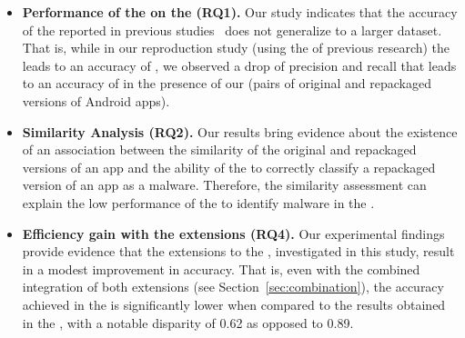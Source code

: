 \begin{itemize}
\item \textbf{Performance of the \mas on the \cds (RQ1).} 
  Our study indicates that the accuracy of the \mas reported in
  previous studies~\cite{DBLP:conf/wcre/BaoLL18,DBLP:journals/jss/CostaMMSSBNR22} does not
  generalize to a larger dataset. That is, while in our
  reproduction study (using the \sds of previous research) the \mas
  leads to an accuracy of \fscoreSmall, we observed a drop of precision and recall
  that leads to an accuracy of \fscore in the presence of our \cds (\apps pairs of
  original and repackaged versions of Android apps). 


\item \textbf{Similarity Analysis (RQ2).} Our results bring evidence about the existence of an association between the similarity of the original and repackaged versions of an app and the ability of the \mas to correctly classify a repackaged version of an app as a malware. Therefore, the similarity assessment can explain the low performance of the \mas to identify malware in the \cds.

\item \textbf{Efficiency gain with the \mas extensions (RQ4).}
Our experimental findings provide evidence that the extensions to the \mas,
investigated in this study, result in a modest improvement in accuracy. That is, even with the combined integration of both extensions (see Section~\ref{sec:combination}), the accuracy achieved in the \cds is significantly lower when compared to the results obtained in the \sds, with a notable disparity of 0.62 as opposed to 0.89.

\end{itemize}


